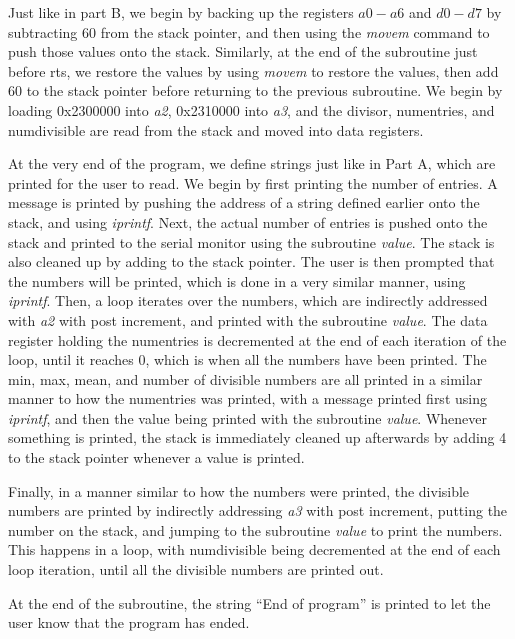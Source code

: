 \documentclass[letterpaper]{article}
\begin{document}
    Just like in part B, we begin by backing up the registers $a0-a6$ and $d0-d7$ by
    subtracting 60 from the stack pointer, and then using the \textit{movem}
    command to push those values onto the stack. Similarly, at the end of the
    subroutine just before rts, we restore the values by using \textit{movem} to restore the values,
    then add 60 to the stack pointer before returning to the previous subroutine.
    We begin by loading 0x2300000 into \textit{a2}, 0x2310000 into \textit{a3},
    and the divisor, numentries, and numdivisible are read from the stack and
    moved into data registers.

    At the very end of the program, we define strings just like
    in Part A, which are printed for the user to read.
    We begin by first printing the number of entries.
    A message is printed by pushing the address of a string defined earlier
    onto the stack, and using \textit{iprintf}. Next, the actual
    number of entries is pushed onto the stack and printed to the
    serial monitor using the subroutine \textit{value}. The stack is also cleaned up by
    adding to the stack pointer. The user is then prompted that the numbers will
    be printed, which is done in a very similar manner, using \textit{iprintf}. Then,
    a loop iterates over the numbers, which are indirectly addressed with \textit{a2} with post increment,
    and printed with the subroutine \textit{value}. The data register holding the numentries
    is decremented at the end of each iteration of the loop, until it reaches 0, which is
    when all the numbers have been printed. The min, max, mean, and number of divisible numbers are all printed
    in a similar manner to how the numentries was printed, with a message
    printed first using \textit{iprintf}, and then the value being printed
    with the subroutine \textit{value}. Whenever something is printed, the stack is
    immediately cleaned up afterwards by adding 4 to the stack pointer whenever a value is printed.

    Finally, in a manner similar to how the numbers were printed, the
    divisible numbers are printed by indirectly addressing \textit{a3} with post
    increment, putting the number on the stack, and jumping to the subroutine
    \textit{value} to print the numbers. This happens in a loop, with numdivisible
    being decremented at the end of each loop iteration, until all the
    divisible numbers are printed out.

    At the end of the subroutine, the string ``End of program'' is printed
    to let the user know that the program has ended.
\end{document}
